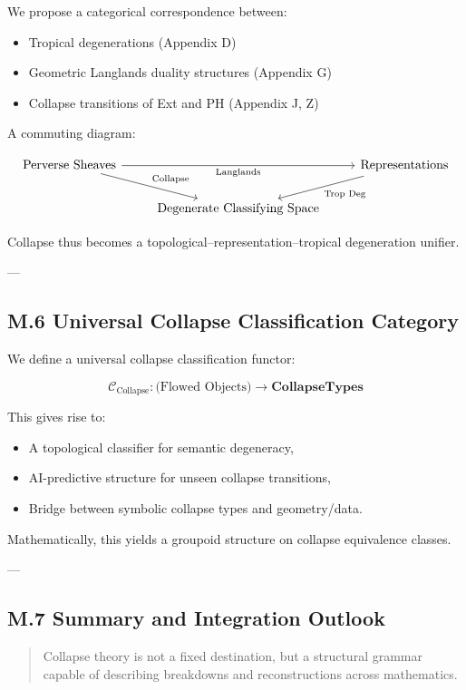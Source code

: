 \documentclass[11pt]{article}
\begin{document}
\begin{axiom}
\begin{axiom}
{{We propose a categorical correspondence between:

\begin{itemize}
  \item Tropical degenerations (Appendix D)
  \item Geometric Langlands duality structures (Appendix G)
  \item Collapse transitions of Ext and PH (Appendix J, Z)
\end{itemize}

A commuting diagram:

\[
\begin{tikzcd}
\text{Perverse Sheaves} \arrow[dr, "\text{Collapse}"] \arrow[rr, "\text{Langlands}"'] & & \text{Representations} \arrow[dl, "\text{Trop Deg}"] \\
& \text{Degenerate Classifying Space} &
\end{tikzcd}
\]

Collapse thus becomes a topological–representation–tropical degeneration unifier.

---

\subsection*{M.6 Universal Collapse Classification Category}

We define a universal collapse classification functor:

\[
\mathcal{C}_{\text{Collapse}} : \text{(Flowed Objects)} \to \mathbf{CollapseTypes}
\]

This gives rise to:

\begin{itemize}
  \item A topological classifier for semantic degeneracy,
  \item AI-predictive structure for unseen collapse transitions,
  \item Bridge between symbolic collapse types and geometry/data.
\end{itemize}

Mathematically, this yields a groupoid structure on collapse equivalence classes.

---

\subsection*{M.7 Summary and Integration Outlook}

\begin{quote}
Collapse theory is not a fixed destination, but a structural grammar  
capable of describing breakdowns and reconstructions across mathematics.
\end{quote}

}}
\end{axiom}
\end{axiom}
\end{document}
